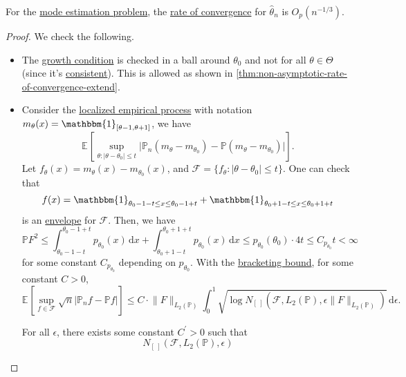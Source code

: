 \begin{proposition}\label{prop:mode-estimation-rate-of-convergence}
	For the \hyperref[eg:mode-estimation]{mode estimation problem}, the \hyperref[def:rate-of-convergence]{rate of convergence} for \(\hat{\theta} _n\) is \(O_p(n^{-1 / 3})\).
\end{proposition}
\begin{proof}
	We check the following.
	\begin{itemize}
		\item The \hyperref[def:growth-condition*]{growth condition} is checked in a ball around \(\theta _0\) and not for all \(\theta \in \Theta \) (since it's \hyperref[def:consistent]{consistent}). This is allowed as shown in \autoref{thm:non-asymptotic-rate-of-convergence-extend}.
		\item Consider the \hyperref[def:localized-EP]{localized empirical process} with notation \(m_\theta (x) = \mathbbm{1}_{[\theta -1, \theta +1]} \), we have
		      \[
			      \mathbb{E}_{}\left[\sup _{\theta \colon \vert \theta - \theta _0 \vert \leq t} \vert \mathbb{P} _n(m_\theta - m_{\theta _0}) - \mathbb{P} (m_\theta - m_{\theta _0}) \vert \right].
		      \]
		      Let \(f_\theta (x) = m_\theta (x) - m_{\theta _0}(x)\), and \(\mathscr{F} = \{ f_\theta \colon \vert \theta -\theta _0 \vert \leq t \} \). One can check that
		      \[
			      f(x) = \mathbbm{1}_{\theta _0 - 1 - t \leq x \leq \theta _0 - 1 + t} + \mathbbm{1}_{\theta _0 + 1 - t \leq x \leq \theta _0 + 1 + t}
		      \]
		      is an \hyperref[def:envelope]{envelope} for \(\mathscr{F} \). Then, we have
		      \[
			      \mathbb{P} F^2
			      \leq \int_{\theta _0 - 1 - t}^{\theta _0 - 1 + t} p_{\theta _0}(x) \,\mathrm{d}x + \int_{\theta _0 + 1 - t}^{\theta _0 + 1 + t} p_{\theta _0}(x)  \,\mathrm{d}x
			      \leq p_{\theta _0}(\theta _0) \cdot 4t
			      \leq C_{p_{\theta _0}} t
			      < \infty
		      \]
		      for some constant \(C_{p_{\theta _0}}\) depending on \(p_{\theta _0}\). With the \hyperref[thm:bracketing-bound]{bracketing bound}, for some constant \(C > 0\),
		      \[
			      \mathbb{E}_{}\left[\sup _{f\in \mathscr{F} } \sqrt{n} \vert \mathbb{P} _n f - \mathbb{P} f \vert \right]
			      \leq C\cdot \lVert F \rVert _{L_2(\mathbb{P} )} \int_{0}^{1} \sqrt{\log N_{[\ ]}(\mathscr{F} , L_2(\mathbb{P} ), \epsilon \lVert F \rVert _{L_2(\mathbb{P} )})} \,\mathrm{d}\epsilon .
		      \]
		      \begin{claim}
			      For all \(\epsilon\), there exists some constant \(C^{\prime} > 0\) such that
			      \[
				      N_{[\ ]}(\mathscr{F} , L_2(\mathbb{P} ), \epsilon )
\]
\end{claim}
\end{itemize}
\end{proof}
